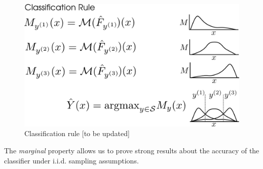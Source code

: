 \documentclass[twoside,11pt]{article}
\begin{document}
\begin{figure}[h]
\centering
\includegraphics[scale = 0.4]{classification_rule.png}
\caption{Classification rule [to be updated]}\label{fig:classification_rule}
\end{figure}

The \emph{marginal} property allows us to prove
strong results about the accuracy of the classifier under
i.i.d. sampling assumptions.
\end{document}
